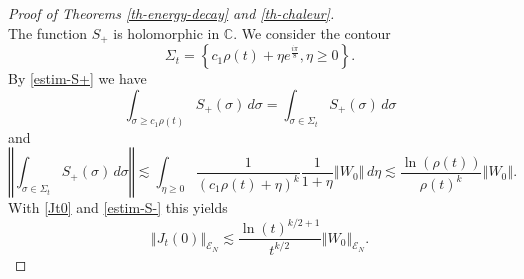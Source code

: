 \documentclass[10pt, a4paper,reqno]{amsart}
\theoremstyle{plain}
\theoremstyle{definition}
\theoremstyle{remark}
\begin{document}
\begin{proof}[Proof of Theorems \ref{th-energy-decay} and \ref{th-chaleur}]
\begin{equation}
\end{equation}
The function $S_+$ is holomorphic in ${\mathbb{C}}$. We consider the contour
\[
\Sigma_t = {\left\{ {c_1 \rho(t) + {\eta} e^{\frac {i\pi}8} , {\eta} {\geqslant} 0} \right\}}.
\]
By \eqref{estim-S+} we have 
\begin{equation*} 
\int_{\sigma {\geqslant} c_1 \rho(t)} S_+(\sigma) \, d\sigma  =  \int_{\sigma \in \Sigma_t} S_+(\sigma) \, d\sigma
\end{equation*}
and
\[
{\left\Vert {\int_{\sigma \in \Sigma_t} S_+(\sigma) \, d\sigma}\right\Vert} \lesssim \int_{{\eta} {\geqslant} 0} \frac 1 {(c_1\rho(t) + {\eta})^k} \frac 1 {1 + {\eta}}{\left\Vert {W_0}\right\Vert} \, d{\eta} \lesssim \frac {\ln(\rho(t))}{\rho(t)^k} {\left\Vert {W_0}\right\Vert}.
\]
With \eqref{Jt0} and \eqref{estim-S-} this yields
\begin{equation} \label{estim-Jto}
{\left\Vert {J_t(0)}\right\Vert}_{\mathscr E_N} \lesssim \frac{\ln(t)^{k/2+1}}{t^{k/2}} {\left\Vert {W_0}\right\Vert}_{\mathscr E_N}.
\end{equation}


\end{proof}
\end{document}
